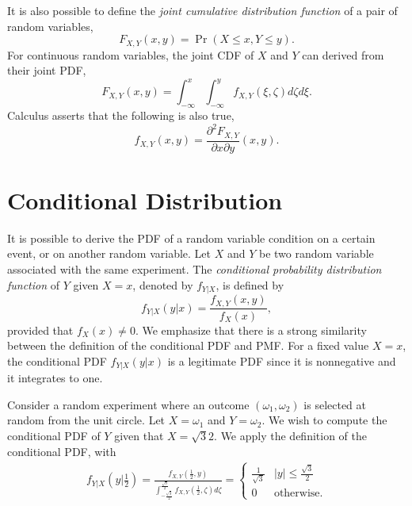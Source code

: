 It is also possible to define the \emph{joint cumulative distribution function} of a pair of random variables, 
\begin{equation*}
F_{X,Y} (x,y) = \Pr (X \leq x, Y \leq y) .
\end{equation*}
For continuous random variables, the joint CDF of $X$ and $Y$ can derived from their joint PDF,
\begin{equation*}
F_{X,Y} (x,y) = \int_{-\infty}^x \int_{-\infty}^y f_{X,Y} (\xi,\zeta) d\zeta d\xi .
\end{equation*}
Calculus asserts that the following is also true,
\begin{equation*}
f_{X,Y} (x,y) = \frac{\partial^2 F_{X,Y}}{\partial x \partial y} (x,y) .
\end{equation*}


\section{Conditional Distribution}

It is possible to derive the PDF of a random variable condition on a certain event, or on another random variable.
Let $X$ and $Y$ be two random variable associated with the same experiment.
The \emph{conditional probability distribution function} of $Y$ given $X = x$, denoted by $f_{Y|X}$, is defined by
\begin{equation} \label{equation:ContinuousConditonalPDF}
f_{Y|X} (y|x) = \frac{f_{X,Y} (x,y)}{f_X(x)},
\end{equation}
provided that $f_X(x) \neq 0$.
We emphasize that there is a strong similarity between the definition of the conditional PDF and PMF.
For a fixed value $X = x$, the conditional PDF $f_{Y|X} (y|x)$ is a legitimate PDF since it is nonnegative and it integrates to one.

\begin{example}
Consider a random experiment where an outcome $(\omega_1, \omega_2)$ is selected at random from the unit circle.
Let $X = \omega_1$ and $Y = \omega_2$.
We wish to compute the conditional PDF of $Y$ given that $X = \sqrt{3}{2}$.
We apply the definition of the conditional PDF, with
\begin{equation*}
\begin{split}
f_{Y|X} \left( y \Big| \frac{1}{2} \right)
= \frac{f_{X,Y} \left( \frac{1}{2}, y \right)}
{\int_{-\frac{\sqrt{3}}{2}}^{\frac{\sqrt{3}}{2}}
f_{X,Y} \left( \frac{1}{2} , \zeta \right) d \zeta }
= \begin{cases} \frac{1}{\sqrt{3}} & |y| \leq \frac{\sqrt{3}}{2} \\
0 & \text{otherwise} . \end{cases}
\end{split}
\end{equation*}
\end{example}

